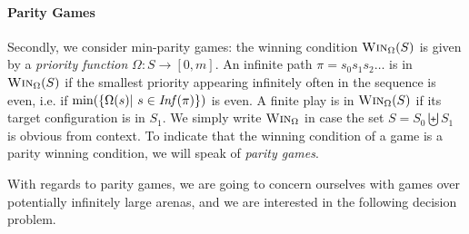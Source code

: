 \documentclass[a4paper,UKenglish,cleveref, autoref, thm-restate]{lipics-v2021}
\newcommand{\problemx}[3]{
	\vspace{0.2cm}
\par\noindent\underline{\sc#1}\par\nobreak\vskip.2\baselineskip
\begingroup\clubpenalty10000\widowpenalty10000
\setbox0\hbox{\bf INPUT:\ }\setbox1\hbox{\bf QUESTION:\ }
\dimen0=\wd0\ifnum\wd1>\dimen0\dimen0=\wd1\fi
\vskip-\parskip\noindent
\hbox to\dimen0{\box0\hfil}\hangindent\dimen0\hangafter1\ignorespaces#2\par
\vskip-\parskip\noindent
\hbox to\dimen0{\box1\hfil}\hangindent\dimen0\hangafter1\ignorespaces#3\par
\endgroup
	\vspace{-0.2cm}
}
\newcommand{\win}{\textsc{Win}}
\begin{document}
\paragraph{Parity Games}

Secondly, we consider min-parity games: 
the winning condition $\win_\Omega(S)$ is given by a {\em priority function} 
 $\Omega : S \to  [0, m]$.
An infinite path $ \pi = s_0 s_1 s_2 \ldots$ is in $\win_\Omega(S)$ if the smallest priority appearing infinitely often in
the sequence 
 is even, i.e.
if $\min( \{ \Omega(s) | ~ s \in \text{\textit{Inf}}( \pi) \})$ is even. 
A finite play is in $\win_\Omega(S)$ if its target configuration is in $S_1$.
We simply write
$\win_\Omega$ in case the set $S = S_0 \biguplus S_1$ is obvious from context.
To indicate that the winning condition of a game is a parity winning condition, we will speak of
 {\em parity games}. 


With regards to parity games, we are going to concern ourselves with games over potentially infinitely large arenas, and we are interested in the following decision problem. \newline





%

%
\end{document}
